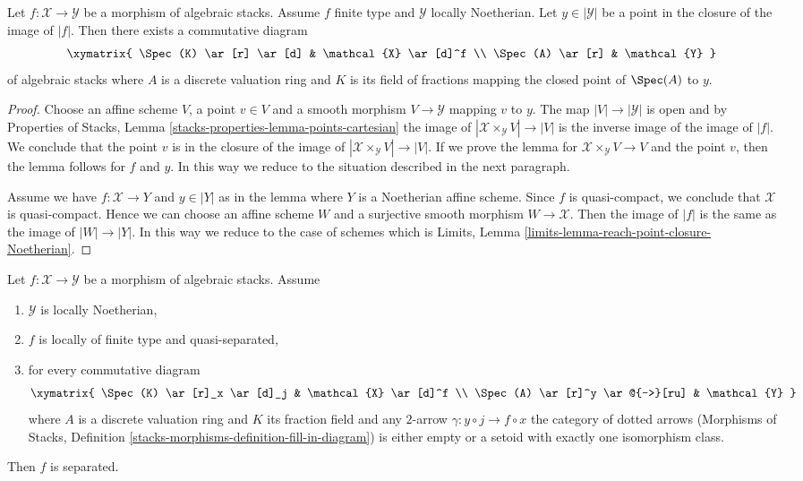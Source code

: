 \begin{lemma}
\label{lemma-reach-point-closure-Noetherian}
Let $f : \mathcal{X} \to \mathcal{Y}$ be a morphism of algebraic stacks.
Assume $f$ finite type and $\mathcal{Y}$ locally Noetherian.
Let $y \in |\mathcal{Y}|$ be a point in the closure of the image of $|f|$.
Then there exists a commutative diagram
$$
\xymatrix{
\Spec(K) \ar[r] \ar[d] & \mathcal{X} \ar[d]^f \\
\Spec(A) \ar[r] & \mathcal{Y}
}
$$
of algebraic stacks where $A$ is a discrete valuation ring and $K$
is its field of fractions mapping the closed point of $\Spec(A)$ to $y$.
\end{lemma}

\begin{proof}
Choose an affine scheme $V$, a point $v \in V$ and a smooth morphism
$V \to \mathcal{Y}$ mapping $v$ to $y$. The map $|V| \to |\mathcal{Y}|$
is open and by
Properties of Stacks, Lemma \ref{stacks-properties-lemma-points-cartesian}
the image of $|\mathcal{X} \times_\mathcal{Y} V| \to |V|$
is the inverse image of the image of $|f|$.
We conclude that the point $v$ is in the closure of the
image of $|\mathcal{X} \times_\mathcal{Y} V| \to |V|$.
If we prove the lemma for
$\mathcal{X} \times_\mathcal{Y} V \to V$ and the point $v$, then
the lemma follows for $f$ and $y$.
In this way we reduce to the situation described in the
next paragraph.

\medskip\noindent
Assume we have $f : \mathcal{X} \to Y$ and $y \in |Y|$ as in the lemma where
$Y$ is a Noetherian affine scheme. Since $f$ is quasi-compact, we conclude that
$\mathcal{X}$ is quasi-compact. Hence we can choose an affine scheme $W$ and
a surjective smooth morphism $W \to \mathcal{X}$. Then the image of
$|f|$ is the same as the image of $|W| \to |Y|$. In this way we reduce
to the case of schemes which is
Limits, Lemma \ref{limits-lemma-reach-point-closure-Noetherian}.
\end{proof}

\begin{lemma}
\label{lemma-check-separated-dvr}
Let $f : \mathcal{X} \to \mathcal{Y}$ be a morphism of algebraic stacks. Assume
\begin{enumerate}
\item $\mathcal{Y}$ is locally Noetherian,
\item $f$ is locally of finite type and quasi-separated,
\item for every commutative diagram
$$
\xymatrix{
\Spec(K) \ar[r]_x \ar[d]_j & \mathcal{X} \ar[d]^f \\
\Spec(A) \ar[r]^y \ar@{-->}[ru] & \mathcal{Y}
}
$$
where $A$ is a discrete valuation ring and $K$ its fraction field
and any $2$-arrow $\gamma : y \circ j \to f \circ x$ the category
of dotted arrows (Morphisms of Stacks, Definition
\ref{stacks-morphisms-definition-fill-in-diagram})
is either empty or a setoid with exactly one isomorphism class.
\end{enumerate}
Then $f$ is separated.
\end{lemma}

